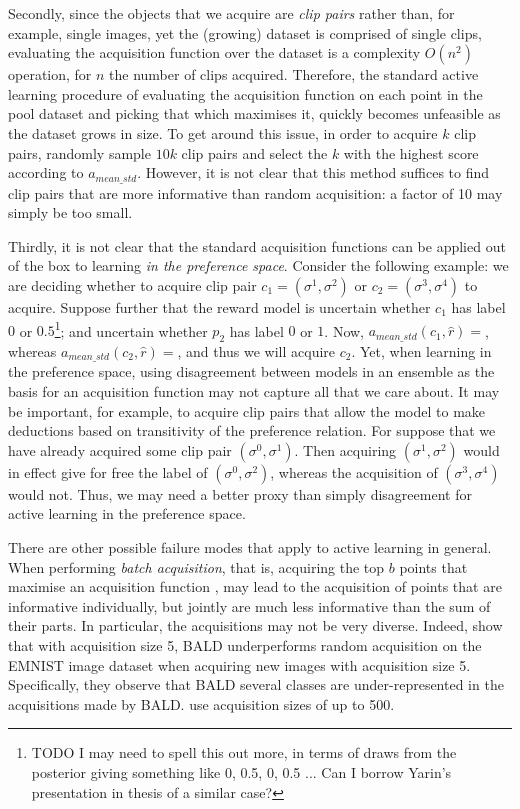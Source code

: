 \documentclass[11pt, a4paper, bibliography=totoc]{report}
\newcommand{\rp}{\hat{r}}
\begin{document}
Secondly, since the objects that we acquire are \textit{clip pairs} rather than, for example, single images, yet the (growing) dataset is comprised of single clips, evaluating the acquisition function over the dataset is a complexity $ O(n^2) $ operation, for $ n $ the number of clips acquired. Therefore, the standard active learning procedure of evaluating the acquisition function on each point in the pool dataset and picking that which maximises it, quickly becomes unfeasible as the dataset grows in size. To get around this issue, in order to acquire $ k $ clip pairs, \cite{Christiano2017} randomly sample $ 10k $ clip pairs and select the $ k $ with the highest score according to $ a_{mean\_std} $. However, it is not clear that this method suffices to find clip pairs that are more informative than random acquisition: a factor of 10 may simply be too small.

Thirdly, it is not clear that the standard acquisition functions can be applied out of the box to learning \textit{in the preference space}. Consider the following example: we are deciding whether to acquire clip pair $ c_1 = (\sigma^1, \sigma^2) $ or $ c_2 = (\sigma^3, \sigma^4) $ to acquire. Suppose further that the reward model is uncertain whether $ c_1 $ has label $ 0 $ or $ 0.5 $\footnote{TODO I may need to spell this out more, in terms of draws from the posterior giving something like 0, 0.5, 0, 0.5 ... Can I borrow Yarin's presentation in thesis of a similar case?}; and uncertain whether $ p_2 $ has label $ 0 $ or $ 1 $. Now, $ a_{mean\_std}(c_1, \rp) =  $, whereas $ a_{mean\_std}(c_2, \rp) =  $, and thus we will acquire $ c_2 $. Yet, when learning in the preference space, using disagreement between models in an ensemble as the basis for an acquisition function may not capture all that we care about. It may be important, for example, to acquire clip pairs that allow the model to make deductions based on transitivity of the preference relation. For suppose that we have already acquired some clip pair $ (\sigma^0, \sigma^1) $. Then acquiring $ (\sigma^1, \sigma^2) $ would in effect give for free the label of $ (\sigma^0, \sigma^2) $, whereas the acquisition of $ (\sigma^3, \sigma^4) $ would not. Thus, we may need a better proxy than simply disagreement for active learning in the preference space.

There are other possible failure modes that apply to active learning in general. When performing \textit{batch acquisition}, that is, acquiring the top $ b $ points that maximise an acquisition function \cite{Gal2017b}, may lead to the acquisition of points that are informative individually, but jointly are much less informative than the sum of their parts. In particular, the acquisitions may not be very diverse. Indeed, \cite[p.~8]{Kirsch2019a} show that with acquisition size 5, BALD underperforms random acquisition on the EMNIST image dataset \cite{cohen2017emnist} when acquiring new images with acquisition size 5. Specifically, they observe that BALD several classes are under-represented in the acquisitions made by BALD. \cite{Christiano2017} use acquisition sizes of up to 500.
\end{document}
